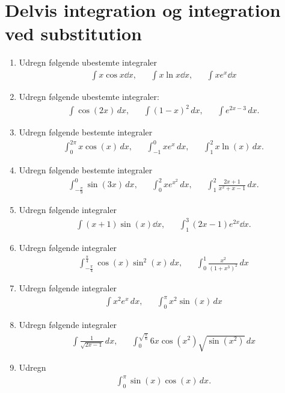 \section{Delvis integration og integration ved substitution}

\begin{enumerate}
	\item \label{it:int21} Udregn følgende ubestemte integraler
	\begin{align*}
	\int x\cos x\dd x,&& \int x\ln x\dd x,&& \int xe^x\dd x
	\end{align*}
	
	\item Udregn følgende ubestemte integraler:
	\begin{align*}
	\int \cos(2x)\, dx,&& \int (1-x)^2\, dx,&& \int e^{2x-3}\, dx.
	\end{align*}
	
	\item Udregn følgende bestemte integraler
	\begin{align*}
	\int_0^{2\pi} x\cos(x)\, dx,&& \int_{-1}^0 xe^x\, dx,&& \int_1^2 x\ln(x)\, dx.
	\end{align*}
	
	\item Udregn følgende bestemte integraler
	\begin{align*}
	\int_{-\frac{\pi}{9}}^0 \sin(3x) \, dx,&& \int_0^2 xe^{x^2}\, dx,&& \int_1^2 \frac{2x+1}{x^2+x-1}\, dx.
	\end{align*}
	
	\item Udregn følgende integraler
	\begin{align*}
	\int (x+1)\sin(x) \dd x,&& \int_1^3 (2x-1) e^{2x} \dd x.
	\end{align*}
	
	\item Udregn følgende integraler
	\begin{align*}
	\int_{-\frac{\pi}{4}}^{\frac{\pi}{4}} \cos(x)\sin^2(x)\, dx ,&& \int_0^1 \frac{x^2}{(1+x^3)^2}\, dx
	\end{align*}
	
	\item Udregn følgende integraler
	\begin{align*}
	\int x^2e^x\, dx,&& \int_0^\pi x^2\sin(x)\, dx
	\end{align*}
	
	\item Udregn følgende integraler
	\begin{align*}
	\int \frac{1}{\sqrt{2x-1}}\, dx,&& \int_0^{\sqrt{\frac{\pi}{6}}} 6x\cos(x^2)\sqrt{\sin(x^2)}\, dx
	\end{align*}
	
	\item Udregn
	\begin{align*}
	\int_0^\pi \sin(x)\cos(x)\, dx.
	\end{align*}
\end{enumerate}